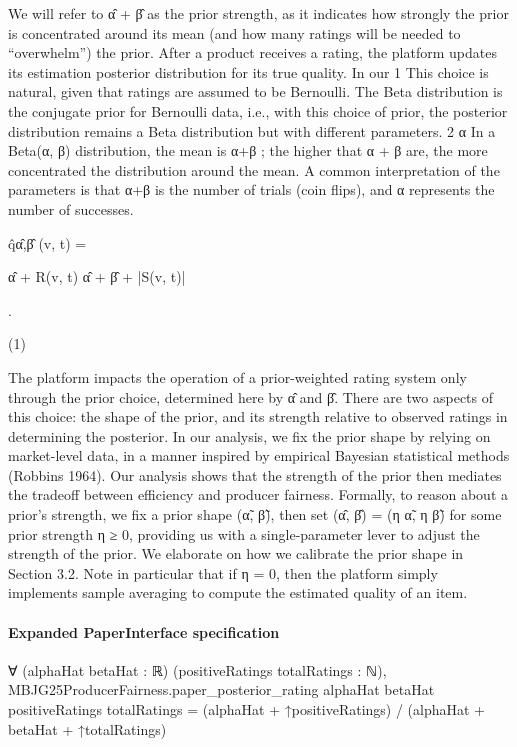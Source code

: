 \documentclass[10pt]{article}
\begin{document}
\begin{ReviewVerbatim}
We will refer to α̂ + β̂ as the prior strength, as it indicates
how strongly the prior is concentrated around its mean (and
how many ratings will be needed to “overwhelm”) the prior.
After a product receives a rating, the platform updates its
estimation posterior distribution for its true quality. In our
1
This choice is natural, given that ratings are assumed to be
Bernoulli. The Beta distribution is the conjugate prior for Bernoulli
data, i.e., with this choice of prior, the posterior distribution remains a Beta distribution but with different parameters.
2
α
In a Beta(α, β) distribution, the mean is α+β
; the higher that
α + β are, the more concentrated the distribution around the mean.
A common interpretation of the parameters is that α+β is the number of trials (coin flips), and α represents the number of successes.

q̂α̂,β̂ (v, t) =

α̂ + R(v, t)
α̂ + β̂ + |S(v, t)|

.

(1)

The platform impacts the operation of a prior-weighted
rating system only through the prior choice, determined here
by α̂ and β̂. There are two aspects of this choice: the shape
of the prior, and its strength relative to observed ratings in
determining the posterior. In our analysis, we fix the prior
shape by relying on market-level data, in a manner inspired
by empirical Bayesian statistical methods (Robbins 1964).
Our analysis shows that the strength of the prior then mediates the tradeoff between efficiency and producer fairness.
Formally, to reason about a prior’s strength, we fix a prior
shape (α̃, β̃), then set (α̂, β̂) = (η α̃, η β̃) for some prior
strength η ≥ 0, providing us with a single-parameter lever
to adjust the strength of the prior. We elaborate on how we
calibrate the prior shape in Section 3.2. Note in particular
that if η = 0, then the platform simply implements sample
averaging to compute the estimated quality of an item.
\end{ReviewVerbatim}


\paragraph{Expanded PaperInterface specification}
\begin{ReviewVerbatim}
∀ (alphaHat betaHat : ℝ) (positiveRatings totalRatings : ℕ),
  MBJG25ProducerFairness.paper_posterior_rating alphaHat betaHat positiveRatings totalRatings =
    (alphaHat + ↑positiveRatings) / (alphaHat + betaHat + ↑totalRatings)
\end{ReviewVerbatim}
\end{document}
